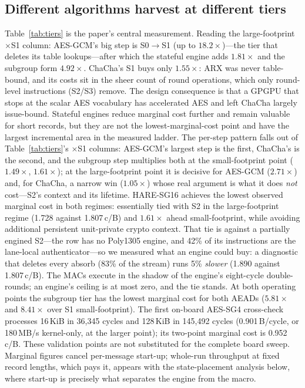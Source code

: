 \documentclass[conference]{IEEEtran}
\newcommand{\cB}{c/B}
\begin{document}
\subsection{Different algorithms harvest at different tiers}
Table~\ref{tab:tiers} is the paper's central measurement. Reading the
large-footprint $\times$S1 column: AES-GCM's big step is S0${\to}$S1
(up to $18.2\times$)---the
tier that deletes its table lookups---after which the stateful engine adds
$1.81\times$ and the subgroup form $4.92\times$. ChaCha's S1 buys only
$1.55\times$: ARX was never table-bound, and its costs sit in the sheer
count of round operations, which only round-level instructions (S2/S3)
remove. The design consequence is that a GPGPU that stops at the scalar AES
vocabulary has accelerated AES and left ChaCha largely issue-bound. Stateful
engines reduce marginal cost further and remain valuable for short records,
but they are not the lowest-marginal-cost point and have the largest
incremental area in the measured ladder.
The per-step pattern falls out of Table~\ref{tab:tiers}'s $\times$S1
columns: AES-GCM's largest step is the first, ChaCha's is the second, and
the subgroup step multiplies both at the small-footprint point ($1.49\times$,
$1.61\times$); at the large-footprint point it is decisive for AES-GCM
($2.71\times$) and, for ChaCha, a narrow win ($1.05\times$) whose real
argument is what it does \emph{not} cost---S2's context and its lifetime.
HARE-SG16 achieves the lowest observed marginal cost in both regimes:
essentially tied with S2 in the large-footprint regime (1.728 against
1.807\,\cB) and $1.61\times$ ahead small-footprint, while avoiding
additional persistent unit-private crypto context. That tie is against a
partially engined S2---the row has no Poly1305 engine, and 42\% of its
instructions are the lane-local authenticator---so we measured what an
engine could buy: a diagnostic that deletes every absorb (83\% of the
stream) runs 5\% \emph{slower} (1.890 against 1.807\,\cB). The MACs execute
in the shadow of the engine's eight-cycle double-rounds; an engine's ceiling
is at most zero, and the tie stands.
At both operating points the subgroup tier has the lowest marginal cost for
both AEADs ($5.81\times$ and $8.41\times$ over S1 small-footprint). The first
on-board AES-SG4 cross-check processes 16\,KiB in 36{,}345 cycles and 128\,KiB
in 145{,}492 cycles (0.901\,B/cycle, or 180\,MB/s kernel-only, at the larger
point); its two-point marginal cost is 0.952\,c/B. These validation points are
not substituted for the complete board sweep. Marginal figures cancel per-message
start-up; whole-run throughput at fixed record lengths, which pays it,
appears with the state-placement analysis below, where start-up is
precisely what separates the engine from the macro.
\end{document}
